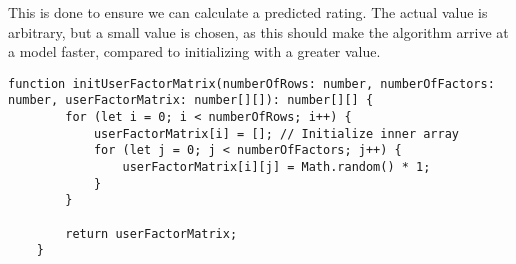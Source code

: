 This is done to ensure we can calculate a predicted rating.
The actual value is arbitrary, but a small value is chosen, as this should make the algorithm arrive at a model faster, compared to initializing with a greater value.
\begin{lstlisting}[caption={Initializing the user and factor matrix}, captionpos=b, label={lst:initUserFactor}]
    function initUserFactorMatrix(numberOfRows: number, numberOfFactors: number, userFactorMatrix: number[][]): number[][] {
        for (let i = 0; i < numberOfRows; i++) {
            userFactorMatrix[i] = []; // Initialize inner array
            for (let j = 0; j < numberOfFactors; j++) {
                userFactorMatrix[i][j] = Math.random() * 1;
            }
        }
    
        return userFactorMatrix;
    }
\end{lstlisting}

